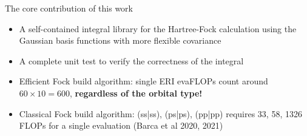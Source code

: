 \documentclass[aspectratio=169]{beamer}
\begin{document}
\begin{frame}{The core contribution of this work}
	\begin{itemize}
		\item A self-contained integral library for the Hartree-Fock calculation
		using the Gaussian basis functions with more flexible covariance
		\item A complete unit test to verify the correctness of the integral
		\item Efficient Fock build algorithm: single ERI
		evaFLOPs count around $60 \times 10 = 600$, \textbf{regardless of the orbital type!}
		\item Classical Fock build algorithm: (ss|ss), (ps|ps), (pp|pp) requires 33, 58, 1326 FLOPs
		for a single evaluation (Barca et al 2020, 2021)
	\end{itemize}
\end{frame}
\end{document}

